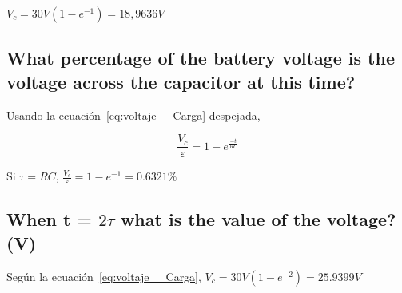 \documentclass[twocolumn, 12pt]{article}
\begin{document}
$V_c = 30V (1 - e^{-1}) = 18,9636V$

\subsection{What percentage of the battery voltage is the voltage across the capacitor at this time?}

Usando la ecuación~\eqref{eq:voltaje__Carga} despejada,

{\large
        \begin{equation}
            \frac{V_c}{\varepsilon} = 1 - e^{\frac{-t}{RC}}
            \label{eq:voltaje__Carga-Porcentaje}
        \end{equation}
    }

Si $\tau = RC$, $\frac{V_c}{\varepsilon} = 1 - e^{-1} =
    0.6321\%$

\subsection{When t = $2\tau$ what is the value of the voltage? (V)}

Según la ecuación~\eqref{eq:voltaje__Carga},
$V_c = 30V (1 - e^{-2}) = 25.9399V$

\printbibliography
\end{document}

